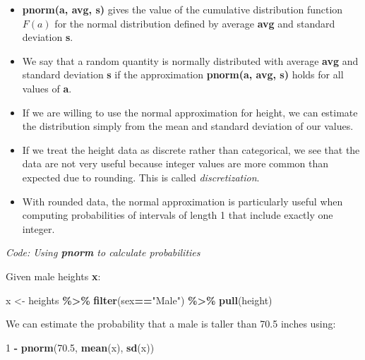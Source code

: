\documentclass[
]{article}
\newenvironment{Shaded}{\begin{snugshade}}{\end{snugshade}}
\newcommand{\DecValTok}[1]{\textcolor[rgb]{0.00,0.00,0.81}{#1}}
\newcommand{\FloatTok}[1]{\textcolor[rgb]{0.00,0.00,0.81}{#1}}
\newcommand{\KeywordTok}[1]{\textcolor[rgb]{0.13,0.29,0.53}{\textbf{#1}}}
\newcommand{\NormalTok}[1]{#1}
\newcommand{\OperatorTok}[1]{\textcolor[rgb]{0.81,0.36,0.00}{\textbf{#1}}}
\newcommand{\StringTok}[1]{\textcolor[rgb]{0.31,0.60,0.02}{#1}}
\providecommand{\tightlist}{%
  \setlength{\itemsep}{0pt}\setlength{\parskip}{0pt}}
\begin{document}
\begin{itemize}
\tightlist
\item
  \textbf{pnorm(a, avg, s)} gives the value of the cumulative
  distribution function \(F(a)\) for the normal distribution defined by
  average \textbf{avg} and standard deviation \textbf{s}.
\item
  We say that a random quantity is normally distributed with average
  \textbf{avg} and standard deviation \textbf{s} if the approximation
  \textbf{pnorm(a, avg, s)} holds for all values of \textbf{a}.
\item
  If we are willing to use the normal approximation for height, we can
  estimate the distribution simply from the mean and standard deviation
  of our values.
\item
  If we treat the height data as discrete rather than categorical, we
  see that the data are not very useful because integer values are more
  common than expected due to rounding. This is called
  \emph{discretization}.
\item
  With rounded data, the normal approximation is particularly useful
  when computing probabilities of intervals of length 1 that include
  exactly one integer.
\end{itemize}

\emph{Code: Using \textbf{pnorm} to calculate probabilities}

Given male heights \textbf{x}:

\begin{Shaded}
\begin{Highlighting}[]
\NormalTok{x \textless{}{-}}\StringTok{ }\NormalTok{heights }\OperatorTok{\%\textgreater{}\%}\StringTok{ }\KeywordTok{filter}\NormalTok{(sex}\OperatorTok{==}\StringTok{"Male"}\NormalTok{) }\OperatorTok{\%\textgreater{}\%}\StringTok{ }\KeywordTok{pull}\NormalTok{(height)}
\end{Highlighting}
\end{Shaded}

We can estimate the probability that a male is taller than 70.5 inches
using:

\begin{Shaded}
\begin{Highlighting}[]
\DecValTok{1} \OperatorTok{{-}}\StringTok{ }\KeywordTok{pnorm}\NormalTok{(}\FloatTok{70.5}\NormalTok{, }\KeywordTok{mean}\NormalTok{(x), }\KeywordTok{sd}\NormalTok{(x))}
\end{Highlighting}
\end{Shaded}
\end{document}

